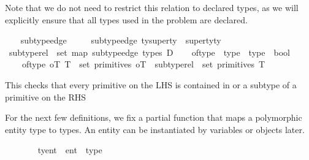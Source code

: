 \begin{isabellebody}
\begin{isamarkuptext}
    Note that we do not need to restrict this relation to declared types,
    as we will explicitly ensure that all types used in the problem are
    declared.%
\end{isamarkuptext}\isamarkuptrue%
\ \ \isamarkupfalse%
\ subtype{\isacharunderscore}{\kern0pt}edge\ \isanewline
\ \ \ \ {\isachardoublequoteopen}subtype{\isacharunderscore}{\kern0pt}edge\ {\isacharparenleft}{\kern0pt}ty{\isacharcomma}{\kern0pt}superty{\isacharparenright}{\kern0pt}\ {\isacharequal}{\kern0pt}\ {\isacharparenleft}{\kern0pt}superty{\isacharcomma}{\kern0pt}ty{\isacharparenright}{\kern0pt}{\isachardoublequoteclose}\isanewline
\isanewline
\ \ \isamarkupfalse%
\ {\isachardoublequoteopen}subtype{\isacharunderscore}{\kern0pt}rel\ {\isasymequiv}\ set\ {\isacharparenleft}{\kern0pt}map\ subtype{\isacharunderscore}{\kern0pt}edge\ {\isacharparenleft}{\kern0pt}types\ D{\isacharparenright}{\kern0pt}{\isacharparenright}{\kern0pt}{\isachardoublequoteclose}\isanewline
\isanewline
\ \ \isamarkupfalse%
\ of{\isacharunderscore}{\kern0pt}type\ {\isacharcolon}{\kern0pt}{\isacharcolon}{\kern0pt}\ {\isachardoublequoteopen}type\ {\isasymRightarrow}\ type\ {\isasymRightarrow}\ bool{\isachardoublequoteclose}\ \isanewline
\ \ \ \ {\isachardoublequoteopen}of{\isacharunderscore}{\kern0pt}type\ oT\ T\ {\isasymequiv}\ set\ {\isacharparenleft}{\kern0pt}primitives\ oT{\isacharparenright}{\kern0pt}\ {\isasymsubseteq}\ subtype{\isacharunderscore}{\kern0pt}rel\isactrlsup {\isacharasterisk}{\kern0pt}\ {\isacharbackquote}{\kern0pt}{\isacharbackquote}{\kern0pt}\ set\ {\isacharparenleft}{\kern0pt}primitives\ T{\isacharparenright}{\kern0pt}{\isachardoublequoteclose}%
\begin{isamarkuptext}%
This checks that every primitive on the LHS is contained in or a
    subtype of a primitive on the RHS%
\end{isamarkuptext}\isamarkuptrue%
%
\begin{isamarkuptext}%
For the next few definitions, we fix a partial function that maps
    a polymorphic entity type  to types. An entity can be
    instantiated by variables or objects later.%
\end{isamarkuptext}\isamarkuptrue%
\ \ \isamarkupfalse%
\isanewline
\ \ \ \ \ ty{\isacharunderscore}{\kern0pt}ent\ {\isacharcolon}{\kern0pt}{\isacharcolon}{\kern0pt}\ {\isachardoublequoteopen}{\isacharprime}{\kern0pt}ent\ {\isasymrightharpoonup}\ type{\isachardoublequoteclose}\ \ %

\end{isabellebody}
